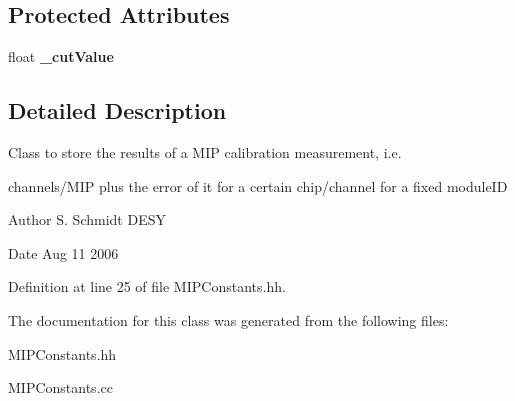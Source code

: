 \subsection*{Protected Attributes}
\begin{DoxyCompactItemize}
\item 
float {\bfseries \-\_\-cut\-Value}\label{classCALICE_1_1MIPConstants_a80a22d8587d8511b6badaf9dd1107b0e}

\end{DoxyCompactItemize}


\subsection{Detailed Description}
Class to store the results of a M\-I\-P calibration measurement, i.\-e. 

channels/\-M\-I\-P plus the error of it for a certain chip/channel for a fixed module\-I\-D \begin{DoxyAuthor}{Author}
S. Schmidt D\-E\-S\-Y 
\end{DoxyAuthor}
\begin{DoxyDate}{Date}
Aug 11 2006 
\end{DoxyDate}


Definition at line 25 of file M\-I\-P\-Constants.\-hh.



The documentation for this class was generated from the following files\-:\begin{DoxyCompactItemize}
\item 
M\-I\-P\-Constants.\-hh\item 
M\-I\-P\-Constants.\-cc\end{DoxyCompactItemize}
